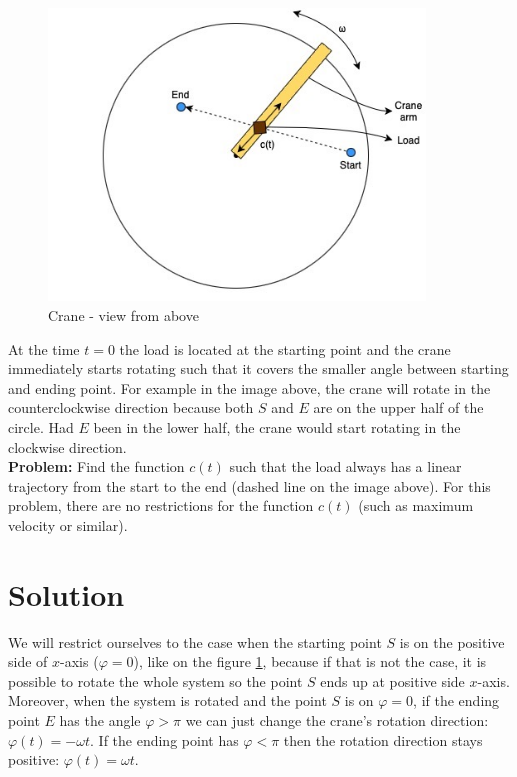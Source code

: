 \documentclass[11pt]{article}
\begin{document}
\begin{figure}[H]
\centering
\includegraphics[width=10cm]{crane.jpg}
\caption{Crane - view from above}
\label{fig:crane}
\end{figure}

At the time $t=0$ the load is located at the starting point and the crane immediately starts rotating such that it covers the smaller angle between starting and ending point. For example in the image above, the crane will rotate in the counterclockwise direction because both $S$ and $E$ are on the upper half of the circle. Had $E$ been in the lower half, the crane would start rotating in the clockwise direction. \\

\textbf{Problem:} Find the function $c(t)$ such that the load always has a linear trajectory from the start to the end (dashed line on the image above). For this problem, there are no restrictions for the function $c(t)$ (such as maximum velocity or similar).

\section{Solution}

We will restrict ourselves to the case when the starting point $S$ is on the positive side of $x$-axis ($\varphi = 0$), like on the figure \ref{fig:crane}, because if that is not the case, it is possible to rotate the whole system so the point $S$ ends up at positive side $x$-axis. Moreover, when the system is rotated and the point $S$ is on $\varphi = 0$, if the ending point $E$ has the angle $\varphi > \pi$ we can just change the crane's rotation direction: $\varphi(t) = -\omega t$. If the ending point has $\varphi < \pi$ then the rotation direction stays positive: $\varphi(t) = \omega t$.\\
\end{document}
